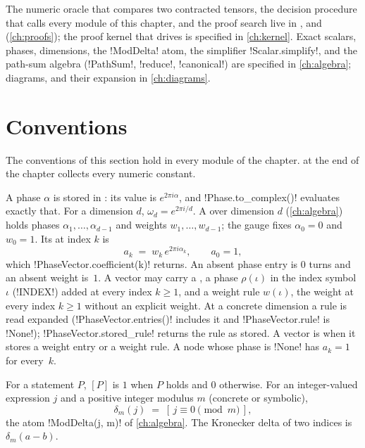 The numeric oracle that compares two contracted tensors, the decision procedure that calls every module of this chapter, and the proof search live in ,  and  (\cref{ch:proofs}); the proof kernel that  drives is specified in \cref{ch:kernel}. Exact scalars, phases, dimensions, the \py!ModDelta! atom, the simplifier \py!Scalar.simplify!, and the path-sum algebra (\py!PathSum!, \py!reduce!, \py!canonical!) are specified in \cref{ch:algebra}; diagrams, \bboxes{} and their expansion in \cref{ch:diagrams}.

\section{Conventions}\label{sec:semantics-conventions}

The conventions of this section hold in every module of the chapter.  at the end of the chapter collects every numeric constant.

\begin{definition}\label{def:semantics-turns}
A phase $\alpha$ is stored in : its value is $e^{2\pi i\alpha}$, and \py!Phase.to_complex()! evaluates exactly that. For a dimension $d$, $\omega_d=e^{2\pi i/d}$. A  over dimension $d$ (\cref{ch:algebra}) holds phases $\alpha_1,\dots,\alpha_{d-1}$ and weights $w_1,\dots,w_{d-1}$; the gauge fixes $\alpha_0=0$ and $w_0=1$. Its  at index $k$ is
\begin{equation}\label{eq:semantics-coefficient}
a_k \;=\; w_k\, e^{2\pi i \alpha_k},\qquad a_0 = 1,
\end{equation}
which \py!PhaseVector.coefficient(k)! returns. An absent phase entry is $0$ turns and an absent weight is~$1$. A vector may carry a , a phase $\rho(\iota)$ in the index symbol $\iota$ (\py!INDEX!) added at every index $k\ge 1$, and a weight rule $w(\iota)$, the weight at every index $k\ge1$ without an explicit weight. At a concrete dimension a rule is read expanded (\py!PhaseVector.entries()! includes it and \py!PhaseVector.rule! is \py!None!); \py!PhaseVector.stored_rule! returns the rule as stored. A vector is  when it stores a weight entry or a weight rule. A node whose phase is \py!None! has $a_k=1$ for every~$k$.
\end{definition}

\begin{definition}\label{def:semantics-delta}
For a statement $P$, $[P]$ is $1$ when $P$ holds and $0$ otherwise. For an integer-valued expression $j$ and a positive integer modulus $m$ (concrete or symbolic),
\[
\delta_m(j) \;=\; [\,j \equiv 0 \pmod m\,],
\]
the atom \py!ModDelta(j, m)! of \cref{ch:algebra}. The Kronecker delta of two indices is $\delta_m(a-b)$.
\end{definition}

